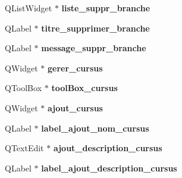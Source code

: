 \begin{DoxyCompactItemize}
\item 
\hypertarget{class_ui___administration_a48e2f80c3b3e5188cf74bfde9d0d29e0}{Q\+List\+Widget $\ast$ {\bfseries liste\+\_\+suppr\+\_\+branche}}\label{class_ui___administration_a48e2f80c3b3e5188cf74bfde9d0d29e0}

\item 
\hypertarget{class_ui___administration_ac449d2533cf2b52a2864a7c3701d4fed}{Q\+Label $\ast$ {\bfseries titre\+\_\+supprimer\+\_\+branche}}\label{class_ui___administration_ac449d2533cf2b52a2864a7c3701d4fed}

\item 
\hypertarget{class_ui___administration_a10e508251d07a80b9e5adb5bf012f8bf}{Q\+Label $\ast$ {\bfseries message\+\_\+suppr\+\_\+branche}}\label{class_ui___administration_a10e508251d07a80b9e5adb5bf012f8bf}

\item 
\hypertarget{class_ui___administration_a770456187349a6a83255feaea28a37b7}{Q\+Widget $\ast$ {\bfseries gerer\+\_\+cursus}}\label{class_ui___administration_a770456187349a6a83255feaea28a37b7}

\item 
\hypertarget{class_ui___administration_abc9c39e01a90e6dd878177fac6b58919}{Q\+Tool\+Box $\ast$ {\bfseries tool\+Box\+\_\+cursus}}\label{class_ui___administration_abc9c39e01a90e6dd878177fac6b58919}

\item 
\hypertarget{class_ui___administration_a295a08a17553f87a54ebea8b55f12dc1}{Q\+Widget $\ast$ {\bfseries ajout\+\_\+cursus}}\label{class_ui___administration_a295a08a17553f87a54ebea8b55f12dc1}

\item 
\hypertarget{class_ui___administration_ad41c2c3a47077fa967e0ca752c804f20}{Q\+Label $\ast$ {\bfseries label\+\_\+ajout\+\_\+nom\+\_\+cursus}}\label{class_ui___administration_ad41c2c3a47077fa967e0ca752c804f20}

\item 
\hypertarget{class_ui___administration_a30a7ebc2d71c16b94260cea3b7b8e2c1}{Q\+Text\+Edit $\ast$ {\bfseries ajout\+\_\+description\+\_\+cursus}}\label{class_ui___administration_a30a7ebc2d71c16b94260cea3b7b8e2c1}

\item 
\hypertarget{class_ui___administration_aa76e3138f5f618415b2a48573841bd36}{Q\+Label $\ast$ {\bfseries label\+\_\+ajout\+\_\+description\+\_\+cursus}}\label{class_ui___administration_aa76e3138f5f618415b2a48573841bd36}


\end{DoxyCompactItemize}
